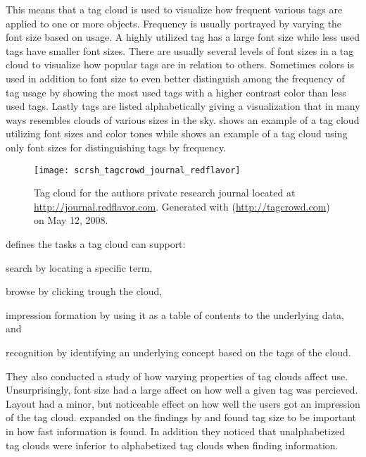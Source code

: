 This means that a tag cloud is used to visualize how frequent various tags
are applied to one or more objects. Frequency is usually portrayed by varying
the font size based on usage. A highly utilized tag has a large font size
while less used tags have smaller font sizes. There are usually several levels
of font sizes in a tag cloud to visualize how popular tags are in relation to
others. Sometimes colors is used in addition to font size to even better
distinguish among the frequency of tag usage by showing the most used tags
with a higher contrast color than less used tags. Lastly tags are listed
alphabetically giving a visualization that in many ways resembles clouds of
various sizes in the sky.
shows an example of a tag cloud utilizing font sizes and color tones while
 shows an example of a tag cloud using
only font sizes for distinguishing tags by frequency.

\begin{figure}
  \texttt{[image: scrsh\_tagcrowd\_journal\_redflavor]}
  \caption[Research Journal Tag Cloud]{
    Tag cloud for the authors private research journal located
    at \url{http://journal.redflavor.com}. Generated with
     (\url{http://tagcrowd.com}) on May 12, 2008.
  }
  \label{figure:scrsh.tagcrowd.journal.redflavor}
\end{figure}

\citet[]{rivadeneira07} defines the tasks a tag cloud can support:
  \begin{inparaenum}[(i)]
    \item search by locating a specific term,
    \item browse by clicking trough the cloud,
    \item impression formation by using it as a table of contents
      to the underlying data, and
    \item recognition by identifying an underlying concept based on
      the tags of the cloud.
  \end{inparaenum}
They also conducted a study of how varying properties of tag clouds affect
use. Unsurprisingly, font size had a large affect on how well a
given tag was percieved. Layout had a minor, but noticeable effect on
how well the users got an impression of the tag cloud.
\citet[]{halvey07} expanded on the findings by
\citeauthor{rivadeneira07} and found tag size to be important in how
fast information is found. In addition they noticed that unalphabetized
tag clouds were inferior to alphabetized tag clouds when finding information.

